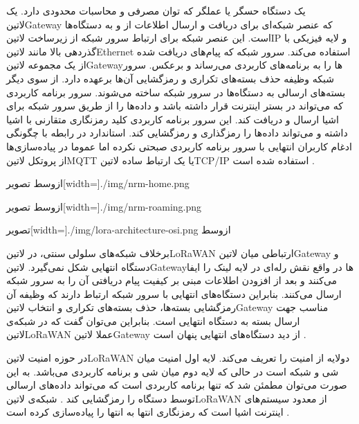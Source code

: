  یک دستگاه حسگر یا عملگر که توان مصرفی و محاسبات محدودی دارد.
 یک ‌لاتین{Gateway} که عنصر شبکه‌ای برای دریافت و ارسال اطلاعات از و به دستگاه‌ها است. این عنصر شبکه برای ارتباط سرور شبکه
از زیرساخت ‌لاتین{IP} و لایه فیزیکی با گذردهی بالا مانند ‌لاتین{Ethernet} استفاده می‌کند.
 سرور شبکه که پیام‌های دریافت شده از یک مجموعه ‌لاتین{Gateway}ها را به برنامه‌های کاربردی می‌رساند و برعکس.
سرور شبکه وظیفه حذف بسته‌های تکراری
و رمزگشایی آن‌ها برعهده دارد. از سوی دیگر بسته‌های ارسالی به دستگاه‌ها در سرور شبکه ساخته می‌شوند.
 سرور برنامه کاربردی که می‌تواند در بستر اینترنت قرار داشته باشد و داده‌ها را از طریق سرور شبکه برای اشیا ارسال و دریافت کند.
این سرور برنامه کاربردی کلید رمزنگاری متقارنی با اشیا داشته و می‌تواند داده‌ها را رمزگذاری و رمزگشایی کند. استاندارد در رابطه با چگونگی ادغام
کاربران انتهایی با سرور برنامه کاربردی صبحتی نکرده اما عموما در پیاده‌سازی‌ها از پروتکل ‌لاتین{MQTT} یا یک ارتباط ساده ‌لاتین{TCP/IP} استفاده شده است .

‌ازوسط
‌تصویر[width=\textwidth]{./img/nrm-home.png}

‌ازوسط
‌تصویر[width=\textwidth]{./img/nrm-roaming.png}

‌تصویر[width=\textwidth]{./img/lora-architecture-osi.png}
‌ازوسط

برخلاف شبکه‌های سلولی سنتی، در ‌لاتین{LoRaWAN} ارتباطی میان ‌لاتین{Gateway} و دستگاه انتهایی شکل نمی‌گیرد.
‌لاتین{Gateway}ها در واقع نقش رله‌ای در لایه لینک را ایفا می‌کنند و بعد از افزودن اطلاعات مبنی بر کیفیت پیام دریافتی آن
را به سرور شبکه ارسال می‌کنند. بنابراین دستگاه‌های انتهایی با سرور شبکه ارتباط دارند که وظیفه آن رمزگشایی بسته‌ها، حذف بسته‌های تکراری و
انتخاب ‌لاتین{Gateway} مناسب جهت ارسال بسته به دستگاه انتهایی است.
بنابراین می‌توان گفت که در شبکه‌ی ‌لاتین{LoRaWAN} عملا ‌لاتین{Gateway} از دید دستگاه‌های انتهایی پنهان است
.

در حوزه امنیت ‌لاتین{LoRaWAN} دولایه از امنیت را تعریف می‌کند. لایه اول امنیت میان شی و شبکه است در حالی که لایه دوم میان شی و برنامه کاربردی می‌باشد.
به این صورت می‌توان مطمئن شد که تنها برنامه کاربردی است که می‌تواند داده‌های ارسالی توسط دستگاه را رمزگشایی کند
. شبکه‌ی ‌لاتین{LoRaWAN} از معدود سیستم‌های اینترنت اشیا است که رمزنگاری انتها به انتها را پیاده‌سازی کرده است
.


